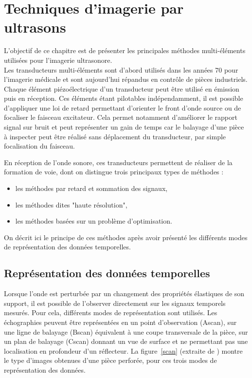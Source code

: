 \chapter{Techniques d'imagerie par ultrasons}
\linenumbers

 L'objectif de ce chapitre est de présenter les principales méthodes multi-éléments utilisées pour l'imagerie ultrasonore. \\

Les transducteurs multi-éléments sont d'abord utilisés dans les années 70 pour l'imagerie médicale et sont aujourd'hui répandus en contrôle de pièces industriels.\\

Chaque élément piézoélectrique d'un transducteur peut être utilisé en émission puis en réception. Ces éléments étant pilotables indépendamment, il est possible d'appliquer une loi de retard permettant d'orienter le front d'onde source ou de focaliser le faisceau excitateur. Cela permet notamment d'améliorer le rapport signal sur bruit et peut représenter un gain de temps car le balayage d'une pièce à inspecter peut être réalisé sans déplacement du transducteur, par simple focalisation du faisceau.

En réception de l'onde sonore, ces transducteurs permettent de réaliser de la formation de voie, dont on distingue trois principaux types de méthodes : 
\begin{itemize}
	\item les méthodes par retard et sommation des signaux,
	\item les méthodes dites "haute résolution",
	\item les méthodes basées sur un problème d'optimisation.
\end{itemize} 

On décrit ici le principe de ces méthodes après avoir présenté les différents modes de représentation des données temporelles.




\section{Représentation des données temporelles}

Lorsque l'onde est perturbée par un changement des propriétés élastiques de son support, il est possible de l'observer directement sur les signaux temporels mesurés. Pour cela, différents modes de représentation sont utilisés. Les échographies peuvent être représentées en un point d'observation (Ascan), sur une ligne de balayage (Bscan) équivalent à une coupe transversale de la pièce,  sur un plan de balayage (Cscan) donnant un vue de surface et ne permettant pas une localisation en profondeur d'un réflecteur. La figure~\ref{scan} (extraite de \cite{bannouf}) montre le type d'images obtenues d'une pièce perforée, pour ces trois modes de représentation des données. \\
 
